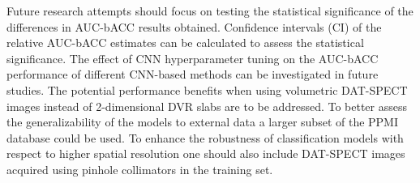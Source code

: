 Future research attempts should focus on testing the statistical significance of 
the differences in AUC-bACC results obtained.
Confidence intervals (CI) of the relative AUC-bACC estimates can be calculated to assess the statistical significance.
The effect of CNN hyperparameter tuning on the AUC-bACC performance of different CNN-based methods 
can be investigated in future studies.
The potential performance benefits when using volumetric DAT-SPECT images instead of 2-dimensional DVR slabs 
are to be addressed.
To better assess the generalizability of the models to external data a larger subset of the PPMI database could be used.
To enhance the robustness of classification models with respect to higher spatial resolution 
one should also include DAT-SPECT images acquired using pinhole collimators in the training set.







